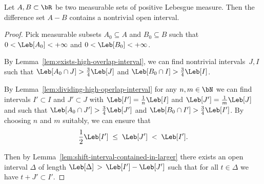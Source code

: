 \begin{lemma}
  \label{lem:different-difference-set-contains-interval}
  Let $A, B \subset \bR$ be two measurable sets of positive Lebesgue measure.
  Then the difference set $A - B$ contains a nontrivial open interval.
\end{lemma}
\begin{proof}
  Pick measurable subsets $A_0 \subseteq A$ and $B_0 \subseteq B$ such that
  $0 < \Leb[A_0] < +\infty$ and $0 < \Leb[B_0] < +\infty$.

  By Lemma~\ref{lem:exists-high-overlap-interval}, we can find nontrivial intervals~$J, I$
  such that $\Leb[A_0 \cap J] > \frac{3}{4} \Leb[J]$
  and $\Leb[B_0 \cap I] > \frac{3}{4} \Leb[I]$.

  By Lemma~\ref{lem:dividing-high-operlap-interval}
  for any $n,m \in \bN$ we can find intervals
  $I' \subset I$ and $J' \subset J$
  with $\Leb[I'] = \frac{1}{n} \Leb[I]$ and $\Leb[J'] = \frac{1}{m} \Leb[J]$
  and such that $\Leb[A_0 \cap J'] > \frac{3}{4} \Leb[J']$
  and $\Leb[B_0 \cap I'] > \frac{3}{4} \Leb[I']$.
  By choosing $n$ and $m$ suitably, we can ensure that
  \begin{align*}
    \frac{1}{2} \Leb[I'] \; \le \; \Leb[J'] \; < \; \Leb[I'] .
  \end{align*}

  Then by Lemma~\ref{lem:shift-interval-contained-in-larger}
  there exists an open interval $\Delta$ of length
  $\Leb[\Delta] \, > \, \Leb[I'] - \Leb[J']$ such that
  for all $t \in \Delta$ we have $t + J' \subset I'$.


\end{proof}
